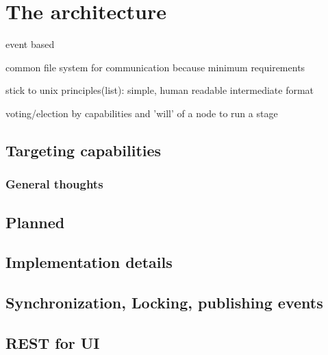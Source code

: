 \chapter{The architecture}

event based

common file system for communication because minimum requirements

stick to unix principles(list): simple, human readable intermediate format

voting/election by capabilities and 'will' of a node to run a stage

\section{Targeting capabilities}

\subsection{General thoughts}

\section{Planned}

\section{Implementation details}

\section{Synchronization, Locking, publishing events}

\section{REST for UI}